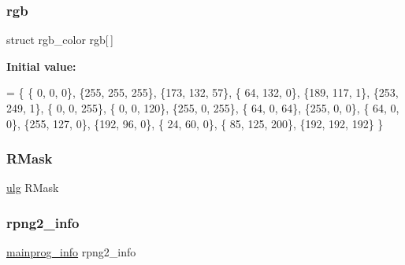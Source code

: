 \mbox{\label{rpng2-x_8c_a3640ea0c70d52a4d9bb9b79008e91dc5}} 
\subsubsection{\texorpdfstring{rgb}{rgb}}
{\footnotesize\ttfamily struct rgb\+\_\+color  rgb\mbox{[}$\,$\mbox{]}\hspace{0.3cm}{\ttfamily [static]}}

{\bfseries Initial value\+:}
\begin{DoxyCode}
= \{
    \{  0,   0,   0\},    
    \{255, 255, 255\},    
    \{173, 132,  57\},    
    \{ 64, 132,   0\},    
    \{189, 117,   1\},    
    \{253, 249,   1\},    
    \{  0,   0, 255\},    
    \{  0,   0, 120\},    
    \{255,   0, 255\},    
    \{ 64,   0,  64\},    
    \{255,   0,   0\},    
    \{ 64,   0,   0\},    
    \{255, 127,   0\},    
    \{192,  96,   0\},    
    \{ 24,  60,   0\},    
    \{ 85, 125, 200\},    
    \{192, 192, 192\}     
\}
\end{DoxyCode}
\mbox{\label{rpng2-x_8c_a212e4ea41130e09c64e370b2bb342724}} 
\subsubsection{\texorpdfstring{R\+Mask}{RMask}}
{\footnotesize\ttfamily \mbox{\hyperlink{readpng_8h_abd6f60bf9450af2ecb94097a32c19a64}{ulg}} R\+Mask\hspace{0.3cm}{\ttfamily [static]}}

\mbox{\label{rpng2-x_8c_a620379ebfcc5817eef3e6a063e83f64f}} 
\subsubsection{\texorpdfstring{rpng2\+\_\+info}{rpng2\_info}}
{\footnotesize\ttfamily \mbox{\hyperlink{readpng2_8h_a1b06d069c8b16f46dd13c65e745bbdcb}{mainprog\+\_\+info}} rpng2\+\_\+info\hspace{0.3cm}{\ttfamily [static]}}

\mbox{\label{rpng2-x_8c_a749e9e93860b1af042087034eea7684c}} 
